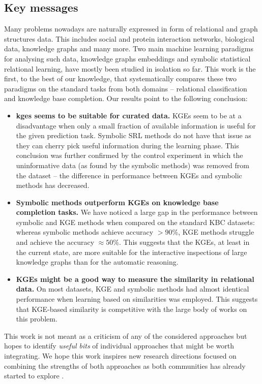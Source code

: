 \subsection{Key messages}


Many problems nowadays are naturally expressed in form of relational and graph structures data.
This includes social and protein interaction networks, biological data, knowledge graphs and many more.
Two main machine learning paradigms for analysing such data, knowledge graphs embeddings and  symbolic statistical relational learning, have mostly been studied in isolation so far.
This work is the first, to the best of our knowledge, that systematically compares these two paradigms on the standard tasks from both domains -- relational classification and knowledge base completion.
Our results point to the following conclusion:
\begin{itemize}
	\item \textbf{\gls{kge}s seems to be suitable for curated data.}  KGEs seem to be at a disadvantage when only a small fraction of available information is useful for the given prediction task. Symbolic SRL methods do not have that issue as they can cherry pick useful information during the learning phase. This conclusion was further confirmed by the control experiment in which the uninformative data (as found by the symbolic methods) was removed from the dataset -- the difference in performance between KGEs and symbolic methods has decreased.
	\item  \textbf{Symbolic methods outperform KGEs on knowledge base completion tasks.} We have noticed a large gap in the performance between symbolic and KGE methods when compared on the standard KBC datasets: whereas symbolic methods achieve accuracy $> 90$\%, KGE methods struggle and achieve the accuracy $\approx 50$\%. This suggests that the KGEs, at least in the current state, are more suitable for the interactive inspections of large knowledge graphs than for the automatic reasoning.
	\item \textbf{KGEs might be a good way to measure the similarity in relational data.} On most datasets, KGE and symbolic methods had almost identical performance when learning based on similarities was employed. This suggests that KGE-based similarity is competitive with the large body of works on this problem.
\end{itemize}

This work is not meant as a criticism of any of the considered approaches but hopes to identify \textit{useful bits} of individual approaches that might be worth integrating.
We hope this work inspires new research directions focused on combining the strengths of both approaches as both communities has already started to explore \cite{DBLP:conf/uai/MinerviniDRR17,demeester2016lifted,Schlichtkrull2017ModelingRD}.



